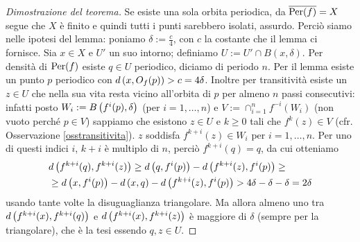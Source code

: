 \begin{proof}[Dimostrazione del teorema]Se esiste una sola orbita periodica,
da $\overline{\operatorname{Per}(f)}=X$ segue che $X$ è finito e quindi tutti i punti sarebbero isolati, assurdo.\newline
Perciò siamo nelle ipotesi del lemma: poniamo $\delta:=\frac{c}{4}$, con $c$ la costante che il lemma ci fornisce.
Sia $x\in X$ e $U'$ un suo intorno; definiamo $U:=U'\cap B(x,\delta)$. Per densità di $\operatorname{Per}(f)$ esiste $q\in U$ periodico,
diciamo di periodo $n$. Per il lemma esiste un punto $p$ periodico con $d\left(x,O_f(p)\right)>c=4\delta$. Inoltre per transitività
esiste un $z\in U$ che nella sua vita resta vicino all'orbita di $p$ per almeno $n$ passi consecutivi:
infatti posto $W_i:=B\left(f^i(p),\delta\right)$ (per $i=1,\dots,n$) e $V:=\cap_{i=1}^n f^{-i}(W_i)$ (non vuoto perché $p\in V$)
sappiamo che esistono $z\in U$ e $k\ge 0$ tali che $f^k(z)\in V$ (cfr. Osservazione \ref{osstransitivita}). $z$ soddisfa
$f^{k+i}(z)\in W_i$ per $i=1,\dots,n$. Per uno di questi indici $i$, $k+i$ è multiplo di $n$,
perciò $f^{k+i}(q)=q$, da cui otteniamo
\[ \begin{split} &d\left(f^{k+i}(q),f^{k+i}(z)\right)\ge d\left(q,f^i(p)\right)-d\left(f^{k+i}(z),f^i(p)\right)\ge \\
&\ge d\left(x,f^i(p)\right)-d\left(x,q\right)-d\left(f^{k+i}(z),f^i(p)\right)>4\delta-\delta-\delta=2\delta \end{split} \]
usando tante volte la disuguaglianza triangolare. Ma allora almeno uno tra
$d\left(f^{k+i}(x),f^{k+i}(q)\right)$ e $d\left(f^{k+i}(x),f^{k+i}(z)\right)$ è maggiore di $\delta$ (sempre per la triangolare), che è la tesi
essendo $q,z\in U$.
\end{proof}



